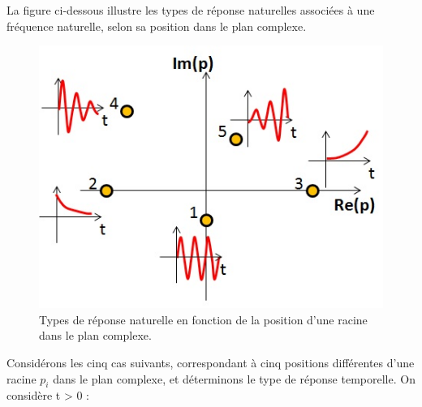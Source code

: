         La figure ci-dessous illustre les types de réponse naturelles
        associées à une fréquence naturelle, selon sa position dans le
        plan complexe.
	\begin{figure}[htbp]
          \centering
          \includegraphics[scale=0.5]{images/reponse_vs_p.jpg}
          \caption{Types de réponse naturelle en fonction de la
            position d'une racine dans le plan complexe.}
          \label{Fig:reponse_vs_p}
	\end{figure}
        Considérons les cinq cas suivants, correspondant à cinq
        positions différentes d'une racine $p_{i}$ dans le plan
        complexe, et déterminons le type de réponse temporelle. On
        considère t > 0 :
